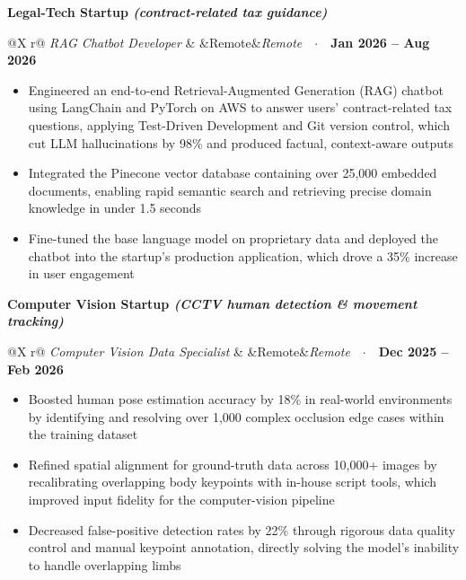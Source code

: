 \documentclass[letterpaper,10pt]{article}
\makeatletter
\newcommand{\org}[1]{\vspace{2pt}\textbf{#1}\par\vspace{-1pt}}
\newcommand{\role}[3]{%
  \begin{tabularx}{\textwidth}{@{}X r@{}}
    \textit{#1} & \ifx&#2&\else\textit{#2}\ \ $\cdot$\ \ \fi\textbf{#3}\\
  \end{tabularx}\vspace{-3pt}}
\makeatother
\begin{document}
\org{Legal-Tech Startup \normalfont\textit{(contract-related tax guidance)}}
\role{RAG Chatbot Developer}{Remote}{Jan 2026 -- Aug 2026}
\begin{itemize}
  \item Engineered an end-to-end Retrieval-Augmented Generation (RAG) chatbot using LangChain and PyTorch on AWS to answer
        users' contract-related tax questions, applying Test-Driven Development and Git version control, which cut LLM
        hallucinations by 98\% and produced factual, context-aware outputs
  \item Integrated the Pinecone vector database containing over 25,000 embedded documents, enabling rapid semantic search
        and retrieving precise domain knowledge in under 1.5 seconds
  \item Fine-tuned the base language model on proprietary data and deployed the chatbot into the startup's production
        application, which drove a 35\% increase in user engagement
\end{itemize}
\org{Computer Vision Startup \normalfont\textit{(CCTV human detection \& movement tracking)}}
\role{Computer Vision Data Specialist}{Remote}{Dec 2025 -- Feb 2026}
\begin{itemize}
  \item Boosted human pose estimation accuracy by 18\% in real-world environments by identifying and resolving over 1,000
        complex occlusion edge cases within the training dataset
  \item Refined spatial alignment for ground-truth data across 10,000+ images by recalibrating overlapping body keypoints
        with in-house script tools, which improved input fidelity for the computer-vision pipeline
  \item Decreased false-positive detection rates by 22\% through rigorous data quality control and manual keypoint
        annotation, directly solving the model's inability to handle overlapping limbs
\end{itemize}
\end{document}
